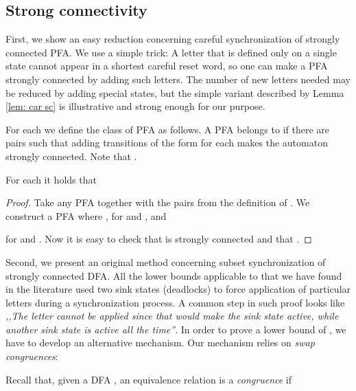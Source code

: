 \documentclass{ws-ijmpc}
\begin{document}
\subsection{Strong connectivity\label{sub:Strong-connectivity}}

First, we show an easy reduction concerning careful synchronization
of strongly connected PFA. We use a simple trick: A letter that is
defined only on a single state cannot appear in a shortest careful
reset word, so one can make a PFA strongly connected by adding such
letters. The number of new letters needed may be reduced by adding
special states, but the simple variant described by Lemma \ref{lem: car sc}
is illustrative and strong enough for our purpose.

For each  we define the class  of PFA as
follows. A PFA  belongs to 
if there are  pairs 
such that adding transitions of the form 
for each  makes the automaton strongly connected. Note
that .
\begin{lemma}
\label{lem: car sc}For each  it holds that

\end{lemma}
\begin{proof}
Take any PFA 
together with the pairs 
from the definition of . We construct a PFA 
where ,
 for 
and , and

for  and . Now it is easy to check that 
is strongly connected and that .
\end{proof}
Second, we present an original method concerning subset synchronization
of strongly connected DFA. All the lower bounds applicable to 
that we have found in the literature used two sink states (deadlocks)
to force application of particular letters during a synchronization
process. A common step in such proof looks like \emph{,,The letter
 cannot be applied since that would make the sink state 
active, while another sink state  is active all the time''}.
In order to prove a lower bound of ,
we have to develop an alternative mechanism. Our mechanism relies
on \emph{swap congruences}:

Recall that, given a DFA , an equivalence
relation  is a \emph{congruence }if 
\end{document}

